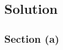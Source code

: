 \documentclass[12pt]{article}
\begin{document}
\subsection{Solution}
\subsubsection{Section (a)}









\end{document}
